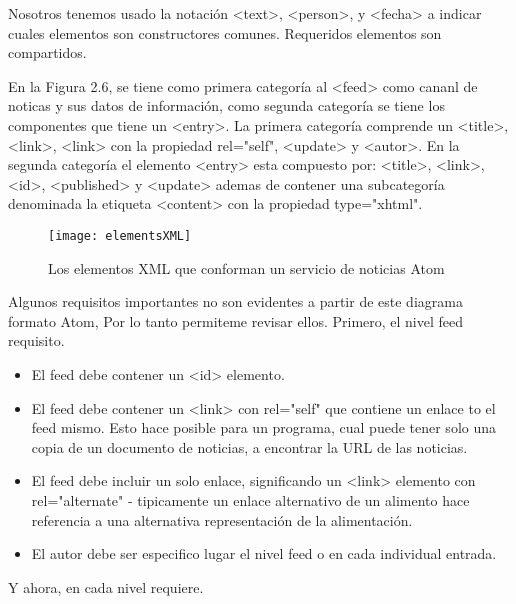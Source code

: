 Nosotros tenemos usado la notación <text>, <person>, y <fecha> a indicar cuales elementos son constructores
comunes. Requeridos elementos son compartidos.

En la Figura 2.6, se tiene como primera categor\'{i}a al <feed> como cananl de noticas y sus datos de informaci\'{o}n,
como segunda categor\'{i}a se tiene los componentes que tiene un <entry>. La primera categor\'{i}a comprende un 
<title>, <link>, <link> con la propiedad rel="self", <update> y <autor>. En la segunda categor\'{i}a el elemento <entry>
esta compuesto por: <title>, <link>, <id>, <published> y <update> ademas de contener una subcategor\'{i}a denominada
la etiqueta <content> con la propiedad type="xhtml".

\begin{figure}[!ht]
\centering
\texttt{[image: elementsXML]}
\caption{Los elementos XML que conforman un servicio de noticias Atom}
\end{figure}


Algunos requisitos importantes no son evidentes a partir de este diagrama formato Atom, Por lo tanto permiteme
revisar ellos. Primero, el nivel feed requisito.

\begin{itemize}

\item El feed debe contener un <id> elemento.
\item El feed debe contener un <link> con rel="self" que contiene un enlace to el feed mismo. Esto hace posible para
un programa, cual puede tener solo una copia de un documento de noticias, a encontrar la URL de las noticias.
\item El feed debe incluir un solo enlace, significando un <link> elemento con rel="alternate" - tipicamente un enlace
alternativo de un alimento hace referencia a una alternativa representación de la alimentación.
\item El autor debe ser especifico lugar el nivel feed o en cada individual entrada.

\end{itemize}

Y ahora, en cada nivel requiere.

